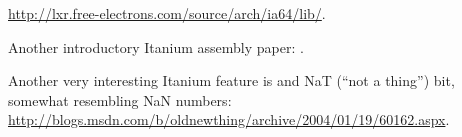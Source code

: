 \url{http://lxr.free-electrons.com/source/arch/ia64/lib/}.

{Another introductory Itanium assembly paper}: \cite{Itanium}.

{Another very interesting Itanium feature is  and NaT (``not a thing'') bit,
somewhat resembling \gls{NaN} numbers}: \\
\url{http://blogs.msdn.com/b/oldnewthing/archive/2004/01/19/60162.aspx}.

